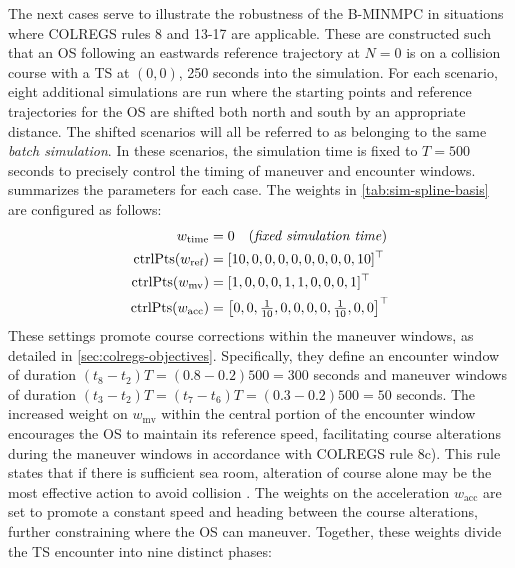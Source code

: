 The next cases serve to illustrate the robustness of the B-MINMPC in situations where COLREGS rules 8 and 13-17 are applicable. These are constructed such that an OS following an eastwards reference trajectory at $N=0$ is on a collision course with a TS at $(0, 0)$, 250 seconds into the simulation. For each scenario, eight additional simulations are run where the starting points and reference trajectories for the OS are shifted both north and south by an appropriate distance. The shifted scenarios will all be referred to as belonging to the same \emph{batch simulation}.
In these scenarios, the simulation time is fixed to $T=500$ seconds to precisely control the timing of maneuver and encounter windows.  summarizes the parameters for each case. The weights in \cref{tab:sim-spline-basis} are configured as follows:
\begin{subequations}
    \begin{align}
        w_\text{time} &= 0 \quad \text{(\emph{fixed simulation time})}  \\
        \operatorname{ctrlPts}(w_\text{ref}) &= [10, 0, 0, 0, 0, 0, 0, 0, 0, 10]^\top     \\
        \operatorname{ctrlPts}(w_\text{mv}) &= [1, 0, 0, 0, 1, 1, 0, 0, 0, 1]^\top      \\
        \operatorname{ctrlPts}(w_\text{acc}) &= \begin{bmatrix}0, 0, \frac{1}{10}, 0, 0, 0, 0, \frac{1}{10}, 0, 0\end{bmatrix}^\top
    \end{align}
\end{subequations}
These settings promote course corrections within the maneuver windows, as detailed in \cref{sec:colregs-objectives}.  Specifically, they define an encounter window of duration $(t_8-t_2)T=(0.8-0.2)500=300$ seconds and maneuver windows of duration $(t_3-t_2)T=(t_7-t_6)T=(0.3-0.2)500=50$ seconds. The increased weight on $w_\text{mv}$ within the central portion of the encounter window encourages the OS to maintain its reference speed, facilitating course alterations during the maneuver windows in accordance with COLREGS rule 8c). This rule states that if there is sufficient sea room, alteration of course alone may be the most effective action to avoid collision \citep{COLREGS}. The weights on the acceleration $w_\text{acc}$ are set to promote a constant speed and heading between the course alterations, further constraining where the OS can maneuver. Together, these weights divide the TS encounter into nine distinct phases:
